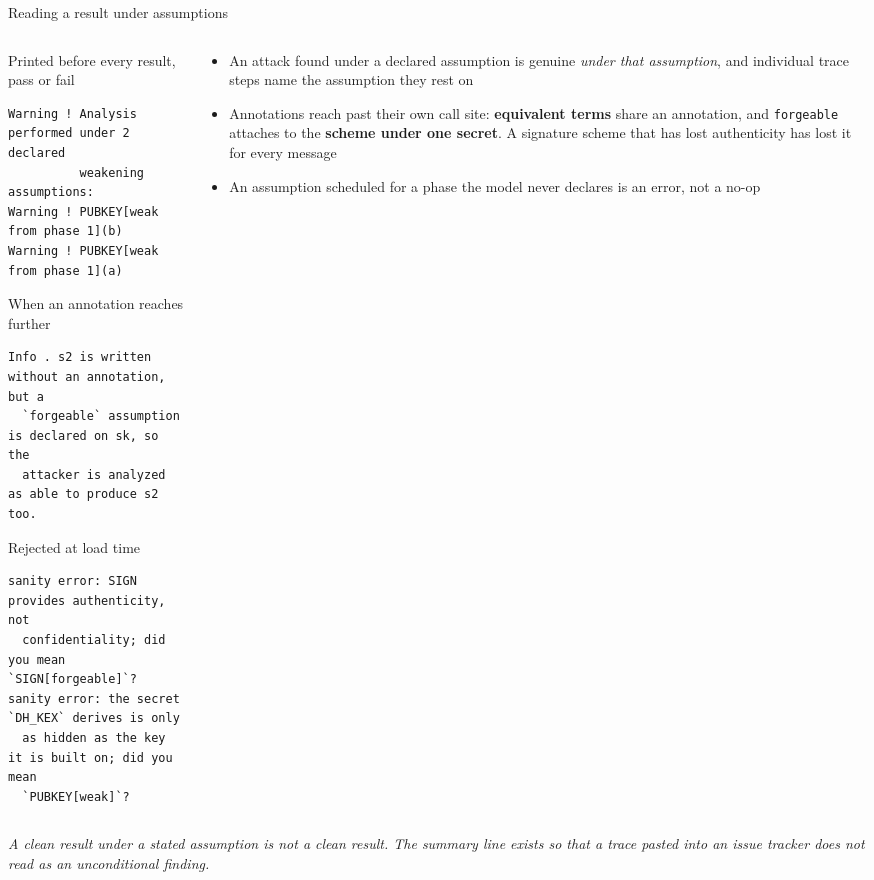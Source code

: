 \ifdefined\PRESENTATION\else\PassOptionsToClass{handout}{beamer}\fi\documentclass[aspectratio=169, lualatex]{beamer}
\newcommand{\vpcode}{\fontsize{6}{6.4}\selectfont\ttfamily\color{vpink}}
\begin{document}
\begin{frame}[fragile]{Reading a result under assumptions}
	\scriptsize
	\begin{columns}[t]
		\begin{column}{0.52\textwidth}
			\begin{vpresult}[top=0.5mm, bottom=0.5mm]{Printed before every result, pass or fail}
				\begin{lstlisting}[basicstyle=\vpcode]
Warning ! Analysis performed under 2 declared
          weakening assumptions:
Warning ! PUBKEY[weak from phase 1](b)
Warning ! PUBKEY[weak from phase 1](a)
\end{lstlisting}
			\end{vpresult}
			\vspace{0.15em}
			\begin{vpresult}[top=0.5mm, bottom=0.5mm]{When an annotation reaches further}
				\begin{lstlisting}[basicstyle=\vpcode]
Info . s2 is written without an annotation, but a
  `forgeable` assumption is declared on sk, so the
  attacker is analyzed as able to produce s2 too.
\end{lstlisting}
			\end{vpresult}
			\vspace{0.15em}
			\begin{vpresult}[top=0.5mm, bottom=0.5mm]{Rejected at load time}
				\begin{lstlisting}[basicstyle=\vpcode]
sanity error: SIGN provides authenticity, not
  confidentiality; did you mean `SIGN[forgeable]`?
sanity error: the secret `DH_KEX` derives is only
  as hidden as the key it is built on; did you mean
  `PUBKEY[weak]`?
\end{lstlisting}
			\end{vpresult}
		\end{column}
		\begin{column}{0.46\textwidth}
			\begin{itemize}
				\item An attack found under a declared assumption is genuine \textit{under that assumption}, and individual trace steps name the assumption they rest on
				\item Annotations reach past their own call site: \textbf{equivalent terms} share an annotation, and \texttt{forgeable} attaches to the \textbf{scheme under one secret}. A signature scheme that has lost authenticity has lost it for every message
				\item An assumption scheduled for a phase the model never declares is an error, not a no-op
			\end{itemize}
		\end{column}
	\end{columns}
	\begin{center}
		\scriptsize
		\textit{A clean result under a stated assumption is not a clean result. The summary line exists so that a trace pasted into an issue tracker does not read as an unconditional finding.}
	\end{center}
\end{frame}
\end{document}
